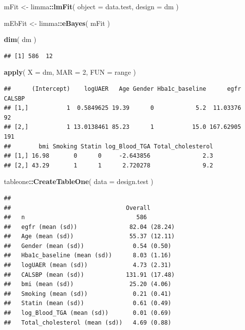 \documentclass[]{article}
\newenvironment{Shaded}{\begin{snugshade}}{\end{snugshade}}
\newcommand{\DataTypeTok}[1]{\textcolor[rgb]{0.13,0.29,0.53}{#1}}
\newcommand{\DecValTok}[1]{\textcolor[rgb]{0.00,0.00,0.81}{#1}}
\newcommand{\KeywordTok}[1]{\textcolor[rgb]{0.13,0.29,0.53}{\textbf{#1}}}
\newcommand{\NormalTok}[1]{#1}
\newcommand{\OperatorTok}[1]{\textcolor[rgb]{0.81,0.36,0.00}{\textbf{#1}}}
\newcommand{\StringTok}[1]{\textcolor[rgb]{0.31,0.60,0.02}{#1}}
\begin{document}
\begin{Shaded}
\begin{Highlighting}[]
\NormalTok{mFit <-}\StringTok{ }\NormalTok{limma}\OperatorTok{::}\KeywordTok{lmFit}\NormalTok{( }\DataTypeTok{object =}\NormalTok{ data.test, }\DataTypeTok{design =}\NormalTok{ dm )}

\NormalTok{mEbFit <-}\StringTok{ }\NormalTok{limma}\OperatorTok{::}\KeywordTok{eBayes}\NormalTok{( mFit )}

\KeywordTok{dim}\NormalTok{( dm )}
\end{Highlighting}
\end{Shaded}

\begin{verbatim}
## [1] 586  12
\end{verbatim}

\begin{Shaded}
\begin{Highlighting}[]
\KeywordTok{apply}\NormalTok{( }\DataTypeTok{X =}\NormalTok{ dm, }\DataTypeTok{MAR =} \DecValTok{2}\NormalTok{, }\DataTypeTok{FUN =}\NormalTok{ range )}
\end{Highlighting}
\end{Shaded}

\begin{verbatim}
##      (Intercept)    logUAER   Age Gender Hba1c_baseline      egfr CALSBP
## [1,]           1  0.5849625 19.39      0            5.2  11.03376     92
## [2,]           1 13.0138461 85.23      1           15.0 167.62905    191
##        bmi Smoking Statin log_Blood_TGA Total_cholesterol
## [1,] 16.98       0      0     -2.643856               2.3
## [2,] 43.29       1      1      2.720278               9.2
\end{verbatim}

\begin{Shaded}
\begin{Highlighting}[]
\NormalTok{tableone}\OperatorTok{::}\KeywordTok{CreateTableOne}\NormalTok{( }\DataTypeTok{data =}\NormalTok{ design.test )}
\end{Highlighting}
\end{Shaded}

\begin{verbatim}
##                                
##                                 Overall       
##   n                                586        
##   egfr (mean (sd))               82.04 (28.24)
##   Age (mean (sd))                55.37 (12.11)
##   Gender (mean (sd))              0.54 (0.50) 
##   Hba1c_baseline (mean (sd))      8.03 (1.16) 
##   logUAER (mean (sd))             4.73 (2.31) 
##   CALSBP (mean (sd))            131.91 (17.48)
##   bmi (mean (sd))                25.20 (4.06) 
##   Smoking (mean (sd))             0.21 (0.41) 
##   Statin (mean (sd))              0.61 (0.49) 
##   log_Blood_TGA (mean (sd))       0.01 (0.69) 
##   Total_cholesterol (mean (sd))   4.69 (0.88)
\end{verbatim}
\end{document}
